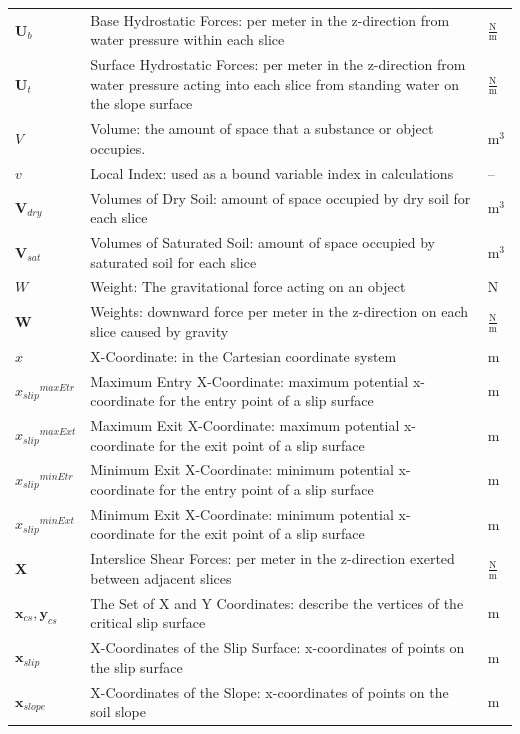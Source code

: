 \documentclass[12pt]{article}
\begin{document}
\begin{longtabu}{l X[l] l}
${\mathbf{U}_{b}}$ & Base Hydrostatic Forces: per meter in the z-direction from water pressure within each slice & $\frac{\text{N}}{\text{m}}$
\\
${\mathbf{U}_{t}}$ & Surface Hydrostatic Forces: per meter in the z-direction from water pressure acting into each slice from standing water on the slope surface & $\frac{\text{N}}{\text{m}}$
\\
$V$ & Volume: the amount of space that a substance or object occupies. & $\text{m}^{3}$
\\
$v$ & Local Index: used as a bound variable index in calculations & --
\\
${\mathbf{V}_{dry}}$ & Volumes of Dry Soil: amount of space occupied by dry soil for each slice & $\text{m}^{3}$
\\
${\mathbf{V}_{sat}}$ & Volumes of Saturated Soil: amount of space occupied by saturated soil for each slice & $\text{m}^{3}$
\\
$W$ & Weight: The gravitational force acting on an object & N
\\
$\mathbf{W}$ & Weights: downward force per meter in the z-direction on each slice caused by gravity & $\frac{\text{N}}{\text{m}}$
\\
$x$ & X-Coordinate: in the Cartesian coordinate system & m
\\
${{x_{slip}}^{maxEtr}}$ & Maximum Entry X-Coordinate: maximum potential x-coordinate for the entry point of a slip surface & m
\\
${{x_{slip}}^{maxExt}}$ & Maximum Exit X-Coordinate: maximum potential x-coordinate for the exit point of a slip surface & m
\\
${{x_{slip}}^{minEtr}}$ & Minimum Exit X-Coordinate: minimum potential x-coordinate for the entry point of a slip surface & m
\\
${{x_{slip}}^{minExt}}$ & Minimum Exit X-Coordinate: minimum potential x-coordinate for the exit point of a slip surface & m
\\
$\mathbf{X}$ & Interslice Shear Forces: per meter in the z-direction exerted between adjacent slices & $\frac{\text{N}}{\text{m}}$
\\
${\mathbf{x}_{cs}},{\mathbf{y}_{cs}}$ & The Set of X and Y Coordinates: describe the vertices of the critical slip surface & m
\\
${\mathbf{x}_{slip}}$ & X-Coordinates of the Slip Surface: x-coordinates of points on the slip surface & m
\\
${\mathbf{x}_{slope}}$ & X-Coordinates of the Slope: x-coordinates of points on the soil slope & m

\end{longtabu}
\end{document}
